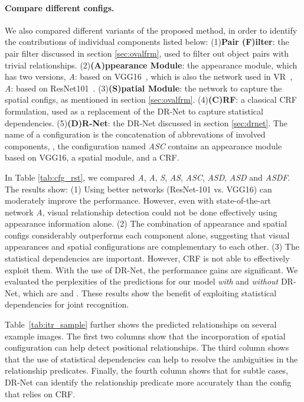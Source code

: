 \paragraph{Compare different configs.}

We also compared different variants of the proposed method, in order
to identify the contributions of individual components listed below:
(1)\textbf{Pair (F)ilter}: the pair filter discussed in section \ref{sec:ovalfrm},
used to filter out object pairs with trivial relationships.
(2)\textbf{(A)ppearance Module}: the appearance module, which has two versions,
\emph{A}: based on VGG16~\cite{Simonyan14c}, which is also the network used in VR~\cite{lu2016visual},
\emph{A}: based on ResNet101~\cite{he2015deep}.
(3)\textbf{(S)patial Module}: the network to capture the spatial configs, as mentioned in section \ref{sec:ovalfrm}.
(4)\textbf{(C)RF}: a classical CRF formulation, used as a replacement of the DR-Net to capture statistical dependencies.
(5)\textbf{(D)R-Net}: the DR-Net discussed in section \ref{sec:drnet}.
The name of a configuration is the concatenation of abbrevations of involved components,
\eg, the configuration named \emph{ASC} contains an appearance module based on VGG16, a spatial module, and a CRF.

In Table \ref{tab:cfg_rst},
we compared \emph{A}, \emph{A}, \emph{S}, \emph{AS}, \emph{ASC}, \emph{ASD}, \emph{ASD} and \emph{ASDF}.
The results show:
(1) Using better networks (ResNet-101 vs. VGG16) can moderately improve the performance.
However, even with state-of-the-art network \emph{A},
visual relationship detection could not be done effectively using appearance information alone.
(2) The combination of appearance and spatial configs considerably outperforms each component alone,
suggesting that visual appearances and spatial configurations are complementary to each other.
(3) The statistical dependencies are important. However, CRF is not able to effectively exploit them.
With the use of DR-Net, the performance gains are significant.
We evaluated the perplexities of the predictions for our model \emph{with} and \emph{without} DR-Net,
which are  and . These results show the benefit of exploiting statistical dependencies for joint recognition.

Table~\ref{tab:itr_sample} further shows the predicted relationships on several example images.
The first two columns show that the incorporation of spatial configuration can
help detect positional relationships.
The third column shows that the use of statistical dependencies can help
to resolve the ambiguities in the relationship predicates.
Finally, the fourth column shows that for subtle cases,
DR-Net can identify the relationship predicate more accurately than
the config that relies on CRF.


